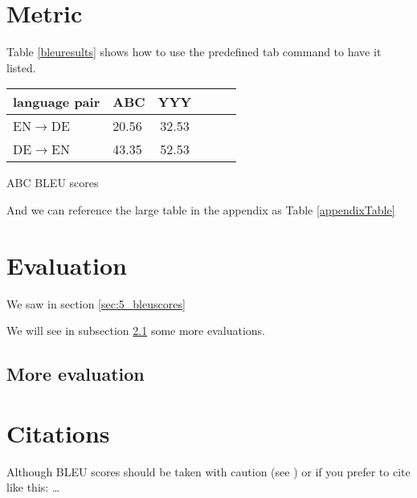 
\label{chap:5_results}

\section{Metric}

Table \ref{bleuresults} shows how to use the predefined tab command to have it listed.
{\begin{tabular}{ll|ccc|c}
language pair		& ABC	& YYY	\\
\hline
EN$\rightarrow$DE	& 20.56	& 32.53 \\
DE$\rightarrow$EN	& 43.35	& 52.53 \\
\hline
\end{tabular}
}{ABC BLEU scores}

And we can reference the large table in the appendix as Table \ref{appendixTable}

\section{Evaluation}
We saw in section \ref{sec:5_bleuscores} 

We will see in subsection \ref{subsec:5_moreeval} some more evaluations.

\subsection{More evaluation}
\label{subsec:5_moreeval}


\section{Citations}
Although BLEU scores should be taken with caution (see \citet{Callison-Burch2006})
or if you prefer to cite like this: \citep{Callison-Burch2006} \ldots


